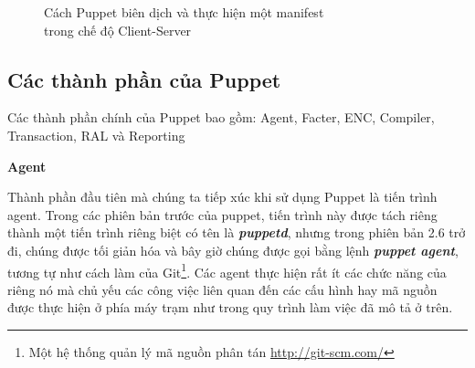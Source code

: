 \begin{figure}[h!]
    \begin{center}
    \end{center}
    \caption{Cách Puppet biên dịch và thực hiện một manifest\\ trong chế độ Client-Server}
    \label{fig:puppet_manifest_to_defined_state_split}
\end{figure}

\clearpage
\subsection{Các thành phần của Puppet}
Các thành phần chính của Puppet bao gồm: Agent, Facter, ENC, Compiler, Transaction, RAL và Reporting


\textbf{\large Agent}


Thành phần đầu tiên mà chúng ta tiếp xúc khi sử dụng Puppet là tiến trình agent. Trong các phiên bản trước của puppet, tiến trình này được tách riêng thành một tiến trình riêng biệt có tên là \textbf{\textit{puppetd}}, nhưng trong phiên bản 2.6 trở đi, chúng được tối giản hóa và bây giờ chúng được gọi bằng lệnh \textbf{\textit{puppet agent}}, tương tự như cách làm của Git\footnote{Một hệ thống quản lý mã nguồn phân tán \url{http://git-scm.com/}}. Các agent thực hiện rất ít các chức năng của riêng nó mà chủ yếu các công việc liên quan đến các cấu hình hay mã nguồn được thực hiện ở phía máy trạm như trong quy trình làm việc đã mô tả ở trên.


